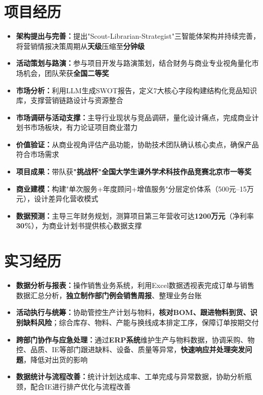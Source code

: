 \documentclass{resume}
\begin{document}
\section{项目经历}
\begin{itemize}[parsep=0.05ex]
  \item \textbf{架构提出与完善：}提出"Scout-Librarian-Strategist"三智能体架构并持续完善，将营销情报决策周期从\textbf{天级}压缩至\textbf{分钟级}
  \item \textbf{活动策划与路演：}参与项目开发与路演策划，结合财务与商业专业视角量化市场机会，团队荣获\textbf{全国二等奖}
  \item \textbf{市场分析：}利用LLM生成SWOT报告，定义7大核心字段构建结构化竞品知识库，支撑营销链路设计与资源整合
\end{itemize}
\begin{itemize}[parsep=0.05ex]
  \item \textbf{市场调研与活动支撑：}主导行业现状与竞品调研，量化设计痛点，完成商业计划书市场板块，有力论证项目商业潜力
  \item \textbf{价值验证：}从商业视角评估产品功能，协助技术团队确认核心卖点，确保产品符合市场需求
  \item \textbf{项目成果：}带队获\textbf{"挑战杯"全国大学生课外学术科技作品竞赛北京市一等奖}
\end{itemize}
\begin{itemize}[parsep=0.05ex]
  \item \textbf{商业建模：}构建"单次服务+年度顾问+增值服务"分层定价体系（500元--15万元），设计差异化营收模式
  \item \textbf{数据预测：}主导三年财务规划，测算项目第三年营收可达\textbf{1200万元}（净利率\textbf{30\%}），为商业计划书提供核心数据支撑
\end{itemize}

\section{实习经历}
\begin{itemize}[parsep=0.05ex]
  \item \textbf{数据分析与报表：}操作销售业务系统，利用Excel数据透视表完成订单与销售数据汇总分析，\textbf{独立制作部门例会销售周报}、整理业务台账
  \item \textbf{活动执行与统筹：}协助管控生产计划与物料，\textbf{核对BOM、跟进物料到货、识别缺料风险}；综合库存、物料、产能与换线成本排定工序，保障订单按期交付
  \item \textbf{跨部门协作与应急处理：}通过\textbf{ERP系统}维护生产与物料数据，协调采购、物控、品质、IE等部门跟进缺料、设备、质量等异常，\textbf{快速响应并处理突发问题}，降低对出货的影响
  \item \textbf{数据统计与流程改善：}统计计划达成率、工单完成与异常数据，协助分析瓶颈，配合IE进行排产优化与流程改善
\end{itemize}
\end{document}
